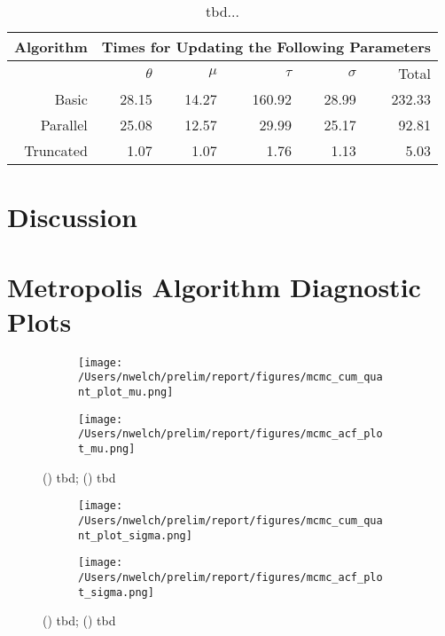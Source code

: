 \documentclass{uwstat572}
\begin{document}
\begin{table}[ht]
\centering
\begin{tabular}{r|rrrrr}
  Algorithm & \multicolumn{5}{c}{Times for Updating the Following Parameters} \\
 \hline
 & $\theta$ & $\mu$ & $\tau$ & $\sigma$ & Total \\ 
  \hline
  Basic & 28.15 & 14.27 & 160.92 & 28.99 & 232.33 \\ 
  Parallel & 25.08 & 12.57 & 29.99 & 25.17 & 92.81 \\ 
  Truncated & 1.07 & 1.07 & 1.76 & 1.13 & 5.03 \\ 
  \hline
\end{tabular}
\caption{tbd...}
\end{table}


\section{Discussion}

\newpage


\newpage
\appendix
\section{Metropolis Algorithm Diagnostic Plots}
\label{metropolis_plots}

\begin{figure}[H]
	\centering
	\begin{subfigure}[b]{0.49\textwidth}
		\texttt{[image: /Users/nwelch/prelim/report/figures/mcmc\_cum\_quant\_plot\_mu.png]}
		\caption{}
		\label{fig:quant_mu}
	\end{subfigure}
	\hfill
	\begin{subfigure}[b]{0.49\textwidth}
		\texttt{[image: /Users/nwelch/prelim/report/figures/mcmc\_acf\_plot\_mu.png]}
		\caption{}
		\label{fig:acf_mu}
	\end{subfigure}
	\caption{() tbd; () tbd }
	\label{fig:data_plot}
\end{figure} 

\begin{figure}[H]
	\centering
	\begin{subfigure}[b]{0.49\textwidth}
		\texttt{[image: /Users/nwelch/prelim/report/figures/mcmc\_cum\_quant\_plot\_sigma.png]}
		\caption{}
		\label{fig:quant_sigma}
	\end{subfigure}
	\hfill
	\begin{subfigure}[b]{0.49\textwidth}
		\texttt{[image: /Users/nwelch/prelim/report/figures/mcmc\_acf\_plot\_sigma.png]}
		\caption{}
		\label{fig:acf_sigma}
	\end{subfigure}
	\caption{() tbd; () tbd }
	\label{fig:data_plot}
\end{figure} 
\end{document}

